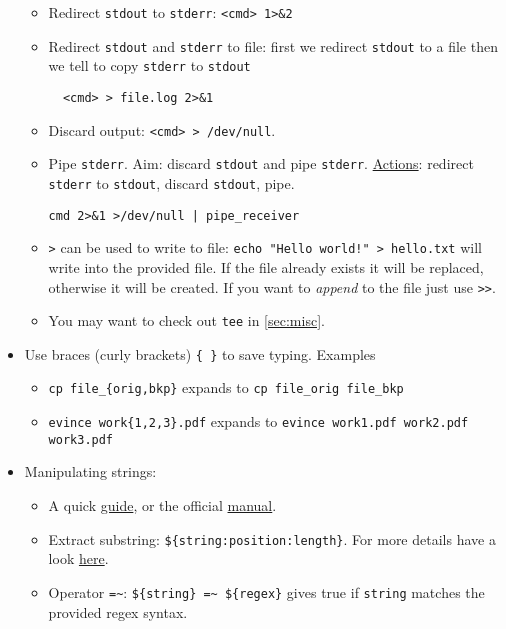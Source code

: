 \documentclass[a4paper,12pt,%
              final%
              ]{article}
\begin{document}
\begin{itemize}
\begin{itemize}
      \item Redirect \texttt{stdout} to \texttt{stderr}: \verb|<cmd> 1>&2|
      \item Redirect \texttt{stdout} and \texttt{stderr} to file: first we redirect \texttt{stdout} to a file then we tell to copy \texttt{stderr} to \texttt{stdout}
\begin{verbatim}
  <cmd> > file.log 2>&1
\end{verbatim}
      \item Discard output: \texttt{<cmd> > /dev/null}.
      \item Pipe \texttt{stderr}. Aim: discard \texttt{stdout} and pipe \texttt{stderr}. \href{https://stackoverflow.com/questions/2342826/how-can-i-pipe-stderr-and-not-stdout}{Actions}: redirect \texttt{stderr} to \texttt{stdout}, discard \texttt{stdout}, pipe.
\begin{verbatim}
cmd 2>&1 >/dev/null | pipe_receiver
\end{verbatim}
      \item \verb|>| can be used to write to file: \verb|echo "Hello world!" > hello.txt| will write into the provided file. If the file already exists it will be replaced, otherwise it will be created. If you want to \emph{append} to the file just use \verb|>>|.
      \item You may want to check out \texttt{tee} in \ref{sec:misc}.
    \end{itemize}
  \item Use braces (curly brackets) \verb|{ }| to save typing. Examples
    \begin{itemize}
      \item \verb|cp file_{orig,bkp}| expands to \verb|cp file_orig file_bkp|
      \item \verb|evince work{1,2,3}.pdf| expands to \verb|evince work1.pdf work2.pdf work3.pdf|
    \end{itemize}
  \item Manipulating strings:
    \begin{itemize}
      \item A quick \href{https://sookocheff.com/post/bash/bash-string-operators/}{guide}, or the official \href{https://www.gnu.org/software/bash/manual/html_node/Shell-Parameter-Expansion.html}{manual}.
      \item Extract substring: \verb|${string:position:length}|. For more details have a look \href{https://stackoverflow.com/questions/1405611/how-to-extract-the-first-two-characters-of-a-string-in-shell-scripting}{here}.
      \item Operator \verb|=~|: \verb|${string} =~ ${regex}| gives true if \verb|string| matches the provided regex syntax.

\end{itemize}
\end{itemize}
\end{document}

